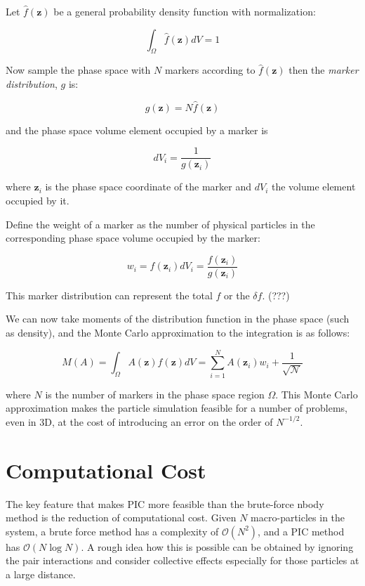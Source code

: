 \documentclass[
  notoc %
]{tufte-book}
\begin{document}
Let \(\hat{f}(\mathbf{z})\) be a general probability density function
with normalization:

\[
\int_\Omega \hat{f}(\mathbf{z})dV = 1
\]

Now sample the phase space with \(N\) markers according to
\(\hat{f}(\mathbf{z})\) then the \emph{marker distribution}, \(g\) is:

\[
g(\mathbf{z}) = N\hat{f}(\mathbf{z})
\]

and the phase space volume element occupied by a marker is

\[
dV_i = \frac{1}{g(\mathbf{z}_i)}
\]

where \(\mathbf{z}_i\) is the phase space coordinate of the marker and
\(dV_i\) the volume element occupied by it.

Define the weight of a marker as the number of physical particles in the
corresponding phase space volume occupied by the marker:

\[
w_i = f(\mathbf{z}_i)dV_i = \frac{f(\mathbf{z}_i)}{g(\mathbf{z}_i)}
\]

This marker distribution can represent the total \(f\) or the
\(\delta f\). (???)

We can now take moments of the distribution function in the phase space
(such as density), and the Monte Carlo approximation to the integration
is as follows:

\[
M(A) = \int_\Omega A(\mathbf{z})f(\mathbf{z})dV = \sum_{i=1}^{N}A(\mathbf{z}_i)w_i + \mathcal{\frac{1}{\sqrt{N}}}
\]

where \(N\) is the number of markers in the phase space region
\(\Omega\). This Monte Carlo approximation makes the particle simulation
feasible for a number of problems, even in 3D, at the cost of
introducing an error on the order of \(N^{-1/2}\).

\hypertarget{computational-cost}{%
\section{Computational Cost}\label{computational-cost}}

The key feature that makes PIC more feasible than the brute-force nbody
method is the reduction of computational cost. Given \(N\)
macro-particles in the system, a brute force method has a complexity of
\(\mathcal{O}(N^2)\), and a PIC method has \(\mathcal{O}(N\log N)\). A
rough idea how this is possible can be obtained by ignoring the pair
interactions and consider collective effects especially for those
particles at a large distance.
\end{document}
